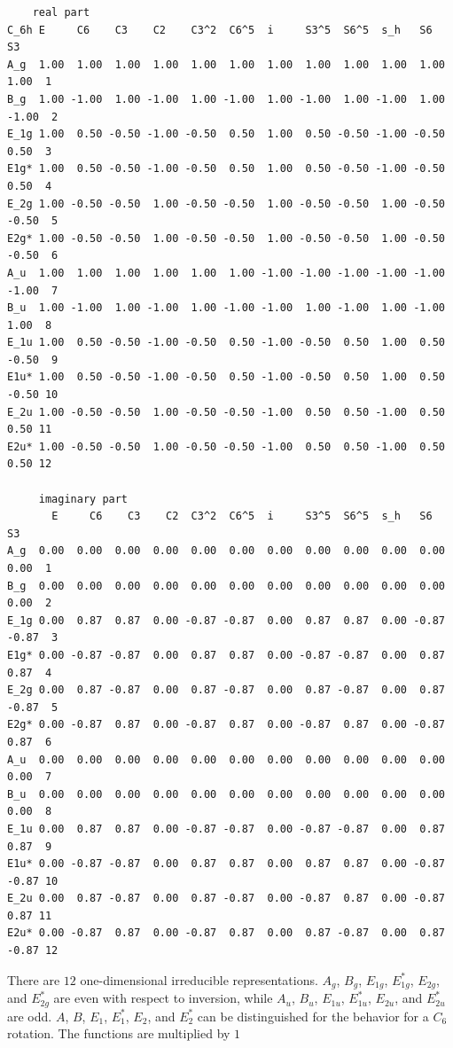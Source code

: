 \documentclass[12pt,a4paper]{article}
\begin{document}
\begin{verbatim}
    real part
C_6h E     C6    C3    C2    C3^2  C6^5  i     S3^5  S6^5  s_h   S6    S3   
A_g  1.00  1.00  1.00  1.00  1.00  1.00  1.00  1.00  1.00  1.00  1.00  1.00  1
B_g  1.00 -1.00  1.00 -1.00  1.00 -1.00  1.00 -1.00  1.00 -1.00  1.00 -1.00  2
E_1g 1.00  0.50 -0.50 -1.00 -0.50  0.50  1.00  0.50 -0.50 -1.00 -0.50  0.50  3
E1g* 1.00  0.50 -0.50 -1.00 -0.50  0.50  1.00  0.50 -0.50 -1.00 -0.50  0.50  4
E_2g 1.00 -0.50 -0.50  1.00 -0.50 -0.50  1.00 -0.50 -0.50  1.00 -0.50 -0.50  5
E2g* 1.00 -0.50 -0.50  1.00 -0.50 -0.50  1.00 -0.50 -0.50  1.00 -0.50 -0.50  6
A_u  1.00  1.00  1.00  1.00  1.00  1.00 -1.00 -1.00 -1.00 -1.00 -1.00 -1.00  7
B_u  1.00 -1.00  1.00 -1.00  1.00 -1.00 -1.00  1.00 -1.00  1.00 -1.00  1.00  8
E_1u 1.00  0.50 -0.50 -1.00 -0.50  0.50 -1.00 -0.50  0.50  1.00  0.50 -0.50  9
E1u* 1.00  0.50 -0.50 -1.00 -0.50  0.50 -1.00 -0.50  0.50  1.00  0.50 -0.50 10
E_2u 1.00 -0.50 -0.50  1.00 -0.50 -0.50 -1.00  0.50  0.50 -1.00  0.50  0.50 11
E2u* 1.00 -0.50 -0.50  1.00 -0.50 -0.50 -1.00  0.50  0.50 -1.00  0.50  0.50 12

     imaginary part
       E     C6    C3    C2  C3^2  C6^5  i     S3^5  S6^5  s_h   S6    S3   
A_g  0.00  0.00  0.00  0.00  0.00  0.00  0.00  0.00  0.00  0.00  0.00  0.00  1
B_g  0.00  0.00  0.00  0.00  0.00  0.00  0.00  0.00  0.00  0.00  0.00  0.00  2
E_1g 0.00  0.87  0.87  0.00 -0.87 -0.87  0.00  0.87  0.87  0.00 -0.87 -0.87  3
E1g* 0.00 -0.87 -0.87  0.00  0.87  0.87  0.00 -0.87 -0.87  0.00  0.87  0.87  4
E_2g 0.00  0.87 -0.87  0.00  0.87 -0.87  0.00  0.87 -0.87  0.00  0.87 -0.87  5
E2g* 0.00 -0.87  0.87  0.00 -0.87  0.87  0.00 -0.87  0.87  0.00 -0.87  0.87  6
A_u  0.00  0.00  0.00  0.00  0.00  0.00  0.00  0.00  0.00  0.00  0.00  0.00  7
B_u  0.00  0.00  0.00  0.00  0.00  0.00  0.00  0.00  0.00  0.00  0.00  0.00  8
E_1u 0.00  0.87  0.87  0.00 -0.87 -0.87  0.00 -0.87 -0.87  0.00  0.87  0.87  9
E1u* 0.00 -0.87 -0.87  0.00  0.87  0.87  0.00  0.87  0.87  0.00 -0.87 -0.87 10
E_2u 0.00  0.87 -0.87  0.00  0.87 -0.87  0.00 -0.87  0.87  0.00 -0.87  0.87 11
E2u* 0.00 -0.87  0.87  0.00 -0.87  0.87  0.00  0.87 -0.87  0.00  0.87 -0.87 12
\end{verbatim}
There are $12$ one-dimensional irreducible representations. $A_g$, 
$B_g$, $E_{1g}$, $E_{1g}^*$, $E_{2g}$, and $E_{2g}^*$ are even with respect to
inversion, while $A_u$, $B_u$, $E_{1u}$, $E_{1u}^*$, $E_{2u}$, and $E_{2u}^*$
are odd. $A$, $B$, $E_1$, $E_1^*$, $E_2$, and $E_2^*$ can be distinguished for
the behavior for a $C_6$ rotation. The functions are multiplied by $1$
\end{document}
